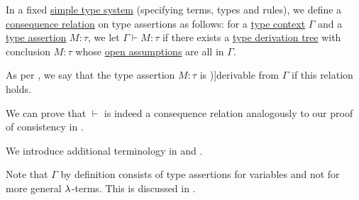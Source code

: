 \begin{definition}\label{def:simple_type_derivability}\mimprovised
  In a fixed \hyperref[def:simple_type_system]{simple type system} (specifying terms, types and rules), we define a \hyperref[def:consequence_relation]{consequence relation} on type assertions as follows: for a \hyperref[def:type_context]{type context} \( \Gamma \) and a \hyperref[def:type_assertion]{type assertion} \( M: \tau \), we let \( \Gamma \vdash M: \tau \) if there exists a \hyperref[def:type_derivation_tree]{type derivation tree} with conclusion \( M: \tau \) whose \hyperref[def:natural_deduction_proof_tree/context]{open assumptions} are all in \( \Gamma \).

  As per , we say that the type assertion \( M: \tau \) is \term[en=derivable (\cite[def. 3.1.4]{Barendregt1992LambdaCalculiWithTypes})]{derivable} from \( \Gamma \) if this relation holds.
\end{definition}
\begin{defproof}
  We can prove that \( {\vdash} \) is indeed a consequence relation analogously to our proof of consistency in .
\end{defproof}
\begin{comments}
  \item We introduce additional terminology in  and .

  \item Note that \( \Gamma \) by definition consists of type assertions for variables and not for more general \( \mathrm{\lambda} \)-terms. This is discussed in .
\end{comments}

